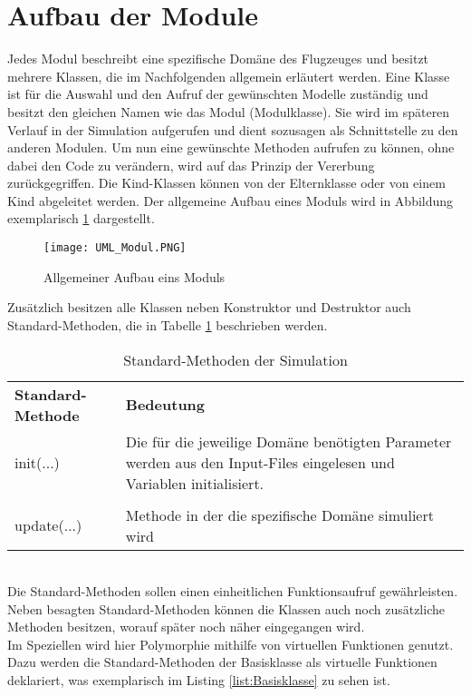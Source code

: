 \section{Aufbau der Module}
\label{sec:AufbauModule}
Jedes Modul beschreibt eine spezifische Domäne des Flugzeuges und  besitzt mehrere Klassen, die im Nachfolgenden allgemein erläutert werden. Eine Klasse ist für die Auswahl und den Aufruf der gewünschten Modelle zuständig und besitzt den gleichen Namen wie das Modul (Modulklasse). Sie wird im späteren Verlauf in der Simulation aufgerufen und dient sozusagen als Schnittstelle zu den anderen Modulen. Um nun eine gewünschte Methoden aufrufen zu können, ohne dabei den Code zu verändern, wird auf das Prinzip der Vererbung  zurückgegriffen.  Die Kind-Klassen können von der Elternklasse oder von einem Kind abgeleitet werden. Der allgemeine Aufbau eines Moduls wird in Abbildung exemplarisch \ref{fig:UML_Modul} dargestellt.
 \begin{figure}[h]
 	 \centering\texttt{[image: UML\_Modul.PNG]}
 	 \caption{Allgemeiner Aufbau eins Moduls }
 	 \label{fig:UML_Modul}
 \end{figure} \newpage
Zusätzlich besitzen alle Klassen neben Konstruktor und Destruktor auch Standard-Methoden, die in Tabelle \ref{tab:Standardmethoden} beschrieben werden.\\
\begin{table}[h]
	\centering	\begin{tabular}{l p{10cm}}
		\textbf{Standard-Methode} & \textbf{Bedeutung}\\
		init(...) & Die für die jeweilige Domäne benötigten Parameter werden aus den Input-Files eingelesen und Variablen initialisiert.\\\\
		update(...) & Methode in der die spezifische Domäne  simuliert wird	\end{tabular}
	\caption{Standard-Methoden der Simulation}
	\label{tab:Standardmethoden}
\end{table}\\
Die Standard-Methoden sollen einen einheitlichen Funktionsaufruf gewährleisten. Neben besagten Standard-Methoden können die Klassen auch noch zusätzliche Methoden besitzen, worauf später noch näher eingegangen wird. \\
Im Speziellen wird hier Polymorphie mithilfe von virtuellen Funktionen genutzt. Dazu werden die Standard-Methoden der Basisklasse als virtuelle Funktionen deklariert, was exemplarisch im Listing \ref{list:Basisklasse} zu sehen ist.

